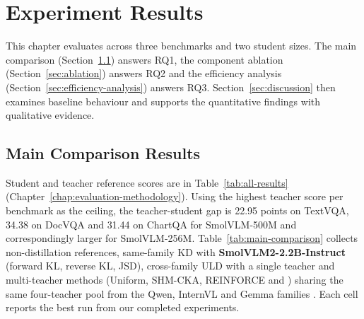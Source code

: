 \chapter{Experiment Results}
\label{chap:experiment-results}

This chapter evaluates \methodname{} across three benchmarks and two student
sizes. The main comparison (Section~\ref{sec:main-comparison-results}) answers
RQ1, the component ablation (Section~\ref{sec:ablation}) answers RQ2 and the
efficiency analysis (Section~\ref{sec:efficiency-analysis}) answers RQ3.
Section~\ref{sec:discussion} then examines baseline behaviour and supports
the quantitative findings with qualitative evidence.

\section{Main Comparison Results}
\label{sec:main-comparison-results}

Student and teacher reference scores are in Table~\ref{tab:all-results}
(Chapter~\ref{chap:evaluation-methodology}). Using the highest teacher score
per benchmark as the ceiling, the teacher-student gap is 22.95 points on
TextVQA, 34.38 on DocVQA and 31.44 on ChartQA for SmolVLM-500M and
correspondingly larger for SmolVLM-256M. Table~\ref{tab:main-comparison} collects non-distillation references,
same-family KD with \textbf{SmolVLM2-2.2B-Instruct}
\cite{smolvlm2_modelcard,marafioti2025smolvlm} (forward KL, reverse KL, JSD),
cross-family ULD with a single teacher and multi-teacher methods (Uniform,
SHM-CKA, REINFORCE and \methodname{}) sharing the same four-teacher pool from
the Qwen, InternVL and Gemma families
\cite{qwen2vl2b_modelcard,wang2024qwen2vl,qwen25vl3b_modelcard,bai2025qwen25vl,internvl3_blog,gemma3_technical_report}.
Each cell reports the best run from our completed experiments.

